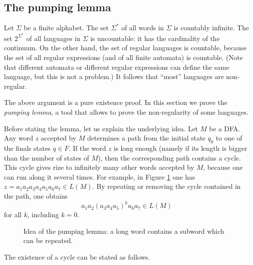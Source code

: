 

\setcounter{section}{3}
\setcounter{subsection}{2}
\setcounter{dfn}{2}

\subsection{The pumping lemma}
Let $\Sigma$ be a finite alphabet.
The set $\Sigma^*$ of all words in $\Sigma$ is countably infinite.
The set $2^{\Sigma^*}$ of all languages in $\Sigma$ is uncountable: it has the cardinality of the continuum.
On the other hand, the set of regular languages is countable, because the set of all regular expressions (and of all finite automata) is countable.
(Note that different automata or different regular expressions can define the same language, but this is not a problem.)
It follows that ``most'' languages are non-regular.

The above argument is a pure existence proof.
In this section we prove the \emph{pumping lemma}, a tool that allows to prove the non-regularity of some languages.

Before stating the lemma, let us explain the underlying idea.
Let $M$ be a DFA.
Any word $z$ accepted by $M$ determines a path from the initial state $q_0$ to one of the finals states $q \in F$.
If the word $z$ is long enough (namely if its length is bigger than the number of states of $M$),
then the corresponding path contains a cycle.
This cycle gives rize to infinitely many other words accepted by $M$, because one can run along it several times.
For example, in Figure \ref{fig:LongWord} one has $z = a_1a_2a_3a_4a_5a_6a_7 \in L(M)$.
By repeating or removing the cycle contained in the path, one obtains
\[
a_1a_2(a_3a_4a_5)^ka_6a_7 \in L(M)
\]
for all $k$, including $k = 0$.

\begin{figure}[ht]
\begin{center}

\end{center}
\caption{Idea of the pumping lemma: a long word contains a subword which can be repeated.}
\label{fig:LongWord}
\end{figure}

The existence of a cycle can be stated as follows.



